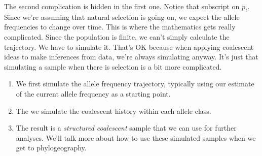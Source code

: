 \documentclass[12pt]{article}
\begin{document}
The second complication is hidden in the first one. Notice that
subscript on $p_t$. Since we're assuming that natural selection is
going on, we expect the allele frequencies to change over time. This
is where the mathematics gets really complicated. Since the population
is finite, we can't simply calculate the trajectory. We have to
simulate it. That's OK because when applying coalescent ideas to make
inferences from data, we're always simulating anyway. It's just that
simulating a sample when there is selection is a bit more complicated.

\begin{enumerate}

  \item We first simulate the allele frequency trajectory, typically
    using our estimate of the current allele frequency as a starting
    point.

  \item The we simulate the coalescent history within each allele
    class.

  \item The result is a {\it structured coalescent}  
    sample that we can use for further analyses. We'll talk more about
    how to use these simulated samples when we get to phylogeography.
    
  \end{enumerate}




\ccLicense
\end{document}
